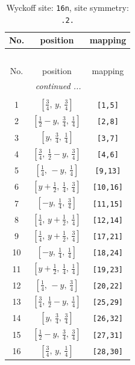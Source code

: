 \documentclass[fleqn,8pt]{jsarticle}
\begin{document}
\begin{longtable}{ccc}
\caption{Wyckoff site: {\tt 16n}, site symmetry: {\tt .2.}}
 \\
 \hline \hline
No. & position & mapping \\ \hline \endfirsthead

\multicolumn{2}{l}{\tablename\ \thetable{}} \\
 \hline \hline
No. & position & mapping \\ \hline \endhead

 \hline \hline
\multicolumn{2}{r}{\footnotesize\it continued ...} \\ \endfoot

 \hline \hline
\multicolumn{2}{r}{} \\ \endlastfoot

1 & $\left[ \frac{3}{4},\, y,\, \frac{3}{4} \right]$ & {\tt [1,5]} \\ \hline
2 & $\left[ \frac{1}{2} - y,\, \frac{3}{4},\, \frac{1}{4} \right]$ & {\tt [2,8]} \\ \hline
3 & $\left[ y,\, \frac{3}{4},\, \frac{1}{4} \right]$ & {\tt [3,7]} \\ \hline
4 & $\left[ \frac{3}{4},\, \frac{1}{2} - y,\, \frac{3}{4} \right]$ & {\tt [4,6]} \\ \hline
5 & $\left[ \frac{1}{4},\, - y,\, \frac{1}{4} \right]$ & {\tt [9,13]} \\ \hline
6 & $\left[ y + \frac{1}{2},\, \frac{1}{4},\, \frac{3}{4} \right]$ & {\tt [10,16]} \\ \hline
7 & $\left[ - y,\, \frac{1}{4},\, \frac{3}{4} \right]$ & {\tt [11,15]} \\ \hline
8 & $\left[ \frac{1}{4},\, y + \frac{1}{2},\, \frac{1}{4} \right]$ & {\tt [12,14]} \\ \hline
9 & $\left[ \frac{1}{4},\, y + \frac{1}{2},\, \frac{3}{4} \right]$ & {\tt [17,21]} \\ \hline
10 & $\left[ - y,\, \frac{1}{4},\, \frac{1}{4} \right]$ & {\tt [18,24]} \\ \hline
11 & $\left[ y + \frac{1}{2},\, \frac{1}{4},\, \frac{1}{4} \right]$ & {\tt [19,23]} \\ \hline
12 & $\left[ \frac{1}{4},\, - y,\, \frac{3}{4} \right]$ & {\tt [20,22]} \\ \hline
13 & $\left[ \frac{3}{4},\, \frac{1}{2} - y,\, \frac{1}{4} \right]$ & {\tt [25,29]} \\ \hline
14 & $\left[ y,\, \frac{3}{4},\, \frac{3}{4} \right]$ & {\tt [26,32]} \\ \hline
15 & $\left[ \frac{1}{2} - y,\, \frac{3}{4},\, \frac{3}{4} \right]$ & {\tt [27,31]} \\ \hline
16 & $\left[ \frac{3}{4},\, y,\, \frac{1}{4} \right]$ & {\tt [28,30]} \\
\end{longtable}
\end{document}
